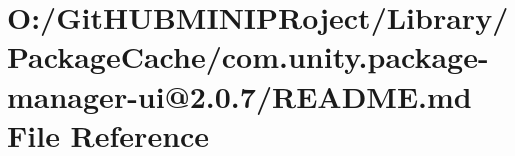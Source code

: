 \hypertarget{_library_2_package_cache_2com_8unity_8package-manager-ui_0D2_80_87_2_r_e_a_d_m_e_8md}{}\section{O\+:/\+Git\+H\+U\+B\+M\+I\+N\+I\+P\+Roject/\+Library/\+Package\+Cache/com.unity.\+package-\/manager-\/ui@2.0.7/\+R\+E\+A\+D\+ME.md File Reference}
\label{_library_2_package_cache_2com_8unity_8package-manager-ui_0D2_80_87_2_r_e_a_d_m_e_8md}
